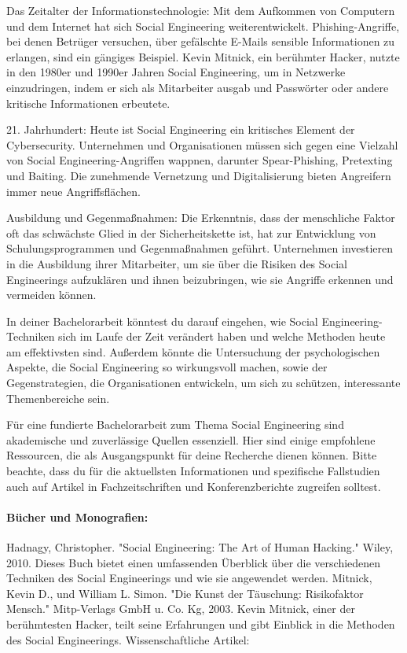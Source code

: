 Das Zeitalter der Informationstechnologie: Mit dem Aufkommen von Computern und dem Internet hat sich Social Engineering weiterentwickelt. Phishing-Angriffe, bei denen Betrüger versuchen, über gefälschte E-Mails sensible Informationen zu erlangen, sind ein gängiges Beispiel. Kevin Mitnick, ein berühmter Hacker, nutzte in den 1980er und 1990er Jahren Social Engineering, um in Netzwerke einzudringen, indem er sich als Mitarbeiter ausgab und Passwörter oder andere kritische Informationen erbeutete.

21. Jahrhundert: Heute ist Social Engineering ein kritisches Element der Cybersecurity. Unternehmen und Organisationen müssen sich gegen eine Vielzahl von Social Engineering-Angriffen wappnen, darunter Spear-Phishing, Pretexting und Baiting. Die zunehmende Vernetzung und Digitalisierung bieten Angreifern immer neue Angriffsflächen.

Ausbildung und Gegenmaßnahmen: Die Erkenntnis, dass der menschliche Faktor oft das schwächste Glied in der Sicherheitskette ist, hat zur Entwicklung von Schulungsprogrammen und Gegenmaßnahmen geführt. Unternehmen investieren in die Ausbildung ihrer Mitarbeiter, um sie über die Risiken des Social Engineerings aufzuklären und ihnen beizubringen, wie sie Angriffe erkennen und vermeiden können.

In deiner Bachelorarbeit könntest du darauf eingehen, wie Social Engineering-Techniken sich im Laufe der Zeit verändert haben und welche Methoden heute am effektivsten sind. Außerdem könnte die Untersuchung der psychologischen Aspekte, die Social Engineering so wirkungsvoll machen, sowie der Gegenstrategien, die Organisationen entwickeln, um sich zu schützen, interessante Themenbereiche sein.

Für eine fundierte Bachelorarbeit zum Thema Social Engineering sind akademische und zuverlässige Quellen essenziell. Hier sind einige empfohlene Ressourcen, die als Ausgangspunkt für deine Recherche dienen können. Bitte beachte, dass du für die aktuellsten Informationen und spezifische Fallstudien auch auf Artikel in Fachzeitschriften und Konferenzberichte zugreifen solltest.

\paragraph*{Bücher und Monografien:}
Hadnagy, Christopher. "Social Engineering: The Art of Human Hacking." Wiley, 2010. Dieses Buch bietet einen umfassenden Überblick über die verschiedenen Techniken des Social Engineerings und wie sie angewendet werden.
Mitnick, Kevin D., und William L. Simon. "Die Kunst der Täuschung: Risikofaktor Mensch." Mitp-Verlags GmbH u. Co. Kg, 2003. Kevin Mitnick, einer der berühmtesten Hacker, teilt seine Erfahrungen und gibt Einblick in die Methoden des Social Engineerings.
Wissenschaftliche Artikel:


